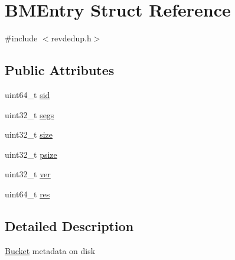 \hypertarget{structBMEntry}{\section{\-B\-M\-Entry \-Struct \-Reference}
\label{structBMEntry}
}


{\ttfamily \#include $<$revdedup.\-h$>$}

\subsection*{\-Public \-Attributes}
\begin{DoxyCompactItemize}
\item 
uint64\-\_\-t \hyperlink{structBMEntry_a86084e47eeb55740eb5782b4e2c01010}{sid}
\item 
uint32\-\_\-t \hyperlink{structBMEntry_a223ee21a6a789e0ff7fbab0625f7958f}{segs}
\item 
uint32\-\_\-t \hyperlink{structBMEntry_adf6e7d636ace7973d4219f9cb2230cb5}{size}
\item 
uint32\-\_\-t \hyperlink{structBMEntry_ae3868e1dcdcb708366dc4a23b2f707ef}{psize}
\item 
uint32\-\_\-t \hyperlink{structBMEntry_aa83f08bc3da9de006644e89a3eeb28e8}{ver}
\item 
uint64\-\_\-t \hyperlink{structBMEntry_a01ebfb22eb304f391f4f2b511bf088c5}{res}
\end{DoxyCompactItemize}


\subsection{\-Detailed \-Description}
\hyperlink{structBucket}{\-Bucket} metadata on disk 

